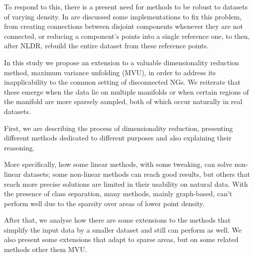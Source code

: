 
To respond to this, there is a present need for methods to be robust to datasets of varying density. In \cite{inspiration, general-landmark, modern} are discussed some implementations to fix this problem, from creating connections between disjoint components whenever they are not connected, or reducing a component's points into a single reference one, to then, after NLDR, rebuild the entire dataset from these reference points.



In this study we propose an extension to a valuable dimensionality reduction method, maximum variance unfolding (MVU), in order to address its inapplicability to the common setting of disconnected NGs. We reiterate that these emerge when the data lie on multiple manifolds or when certain regions of the manifold are more sparsely sampled, both of which occur naturally in real datasets.

First, we are describing the process of dimensionality reduction, presenting different methods dedicated to different purposes and also explaining their reasoning.

More specifically, how some linear methods, with some tweaking, can solve non-linear datasets; some non-linear methods can reach good results, but others that reach more precise solutions are limited in their usability on natural data. With the presence of class separation, many methods, mainly graph-based, can't perform well due to the sparsity over areas of lower point density.

After that, we analyse how there are some extensions to the methods that simplify the input data by a smaller dataset and still can perform as well. We also present some extensions that adapt to sparse areas, but on some related methods other them MVU.